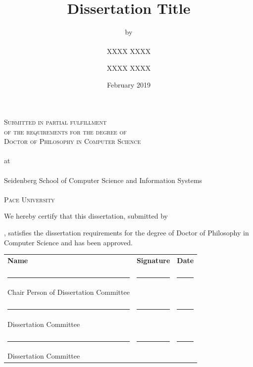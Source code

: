 \documentclass[]{article}
\title{Dissertation Title}
\author{
by
\\~\\
XXXX XXXX
}
\institute{Pace University}
\date{February 2019}
\begin{document}
\renewcommand\headrule{}
\maketitle

\thispagestyle{empty} %

\begin{center}
\vspace{3.5cm}  %
\textsc{
\large
Submitted in partial fulfillment \\
of the requirements for the degree of \\
Doctor of Philosophy in Computer Science
}
\\~\\
at
\\~\\
Seidenberg School of Computer Science and Information Systems
\\~\\
\textsc{Pace University}

\end{center}



\newpage
\thispagestyle{empty}


We hereby certify that this dissertation, submitted by \author{XXXX XXXX}, satisfies the dissertation requirements for the degree of Doctor of Philosophy in Computer Science and has been approved.

\vspace{2.5cm}  %

\newcommand{\signaturerule}{\rule{19em}{.4pt}}
\newcommand{\daterule}{\rule{8em}{.4pt}}
\renewcommand{\arraystretch}{2.0}

\begin{tabular}{lll}
    \bfseries Name  & \bfseries Signature & \bfseries Date \\
    \\
    \signaturerule &\daterule &\daterule\\
    Chair Person of Dissertation Committee\\
    \\
    \signaturerule &\daterule &\daterule\\
    Dissertation Committee\\
    \\
    \signaturerule &\daterule &\daterule\\
    Dissertation Committee\\

\end{tabular}
\end{document}

